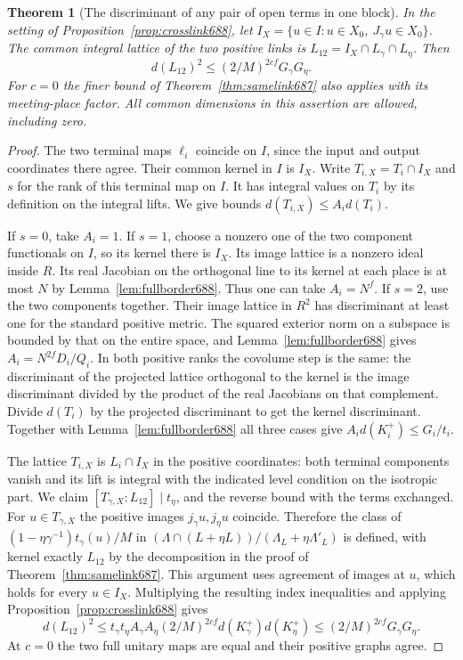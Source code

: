 \documentclass[a4paper,11pt]{article}
\newtheorem{theorem}[proposition]{Theorem}
\theoremstyle{definition}
\theoremstyle{remark}
\numberwithin{equation}{section}
\begin{document}
\begin{theorem}[The discriminant of any pair of open terms in one block]
\leavevmode\label{thm:openpair688}
In the setting of Proposition~\ref{prop:crosslink688}, let
\(I_X=\{u\in I:u\in X_0,\ J_\gamma u\in X_0\}\).
The common integral lattice of the two positive links is
\(L_{12}=I_X\cap L_\gamma\cap L_\eta\). Then
\[
                 d(L_{12})^2\le(2/M)^{2cf}G_\gamma G_\eta .
\]
For \(c=0\) the finer bound of Theorem~\ref{thm:samelink687}
also applies with its meeting-place factor. All common
dimensions in this assertion are allowed, including zero.
\end{theorem}
\begin{proof}
The two terminal maps \(\ell_i\) coincide on \(I\), since the
input and output coordinates there agree. Their common kernel
in \(I\) is \(I_X\). Write \(T_{i,X}=T_i\cap I_X\) and \(s\)
for the rank of this terminal map on \(I\). It has integral
values on \(T_i\) by its definition on the integral lifts.
We give bounds \(d(T_{i,X})\le A_i d(T_i)\).

If \(s=0\), take \(A_i=1\). If \(s=1\), choose a nonzero one
of the two component functionals on \(I\), so its kernel there
is \(I_X\). Its image lattice is a nonzero ideal inside \(R\).
Its real Jacobian on the orthogonal line to its kernel at each
place is at most \(N\) by Lemma~\ref{lem:fullborder688}. Thus
one can take \(A_i=N^f\). If \(s=2\), use the two components
together. Their image lattice in \(R^2\) has discriminant at
least one for the standard positive metric. The squared
exterior norm on a subspace is bounded by that on the entire
space, and Lemma~\ref{lem:fullborder688} gives
\(A_i=N^{2f}D_i/Q_i\).
In both positive ranks the covolume step is the same:
the discriminant of the projected lattice orthogonal to the
kernel is the image discriminant divided by the product of
the real Jacobians on that complement. Divide \(d(T_i)\) by
the projected discriminant to get the kernel discriminant.
Together with Lemma~\ref{lem:fullborder688} all three cases give
\(A_i d(K_i^+)\le G_i/t_i\).

The lattice \(T_{i,X}\) is \(L_i\cap I_X\) in the positive
coordinates: both terminal components vanish and its lift is
integral with the indicated level condition on the isotropic
part. We claim \([T_{\gamma,X}:L_{12}]\mid t_\eta\), and the
reverse bound with the terms exchanged. For \(u\in T_{\gamma,X}\)
the positive images \(j_\gamma u,j_\eta u\) coincide. Therefore
the class of
\((1-\eta\gamma^{-1})t_\gamma(u)/M\) in
\((\Lambda\cap(L+\eta L))/(\Lambda_L+\eta\Lambda'_L)\)
is defined, with kernel exactly \(L_{12}\) by the decomposition
in the proof of Theorem~\ref{thm:samelink687}. This argument uses
agreement of images at \(u\), which holds for every \(u\in I_X\).
Multiplying the resulting index inequalities and applying
Proposition~\ref{prop:crosslink688} gives
\[
 d(L_{12})^2\le t_\gamma t_\eta A_\gamma A_\eta
             (2/M)^{2cf}d(K_\gamma^+)d(K_\eta^+)
          \le (2/M)^{2cf}G_\gamma G_\eta .
\]
At \(c=0\) the two full unitary maps are equal and their
positive graphs agree.
\end{proof}
\end{document}
